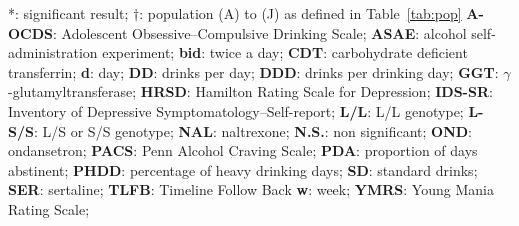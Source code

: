 *: significant result;
$\dagger$: population (A) to (J) as defined in Table~\ref{tab:pop}
\textbf{A-OCDS}: Adolescent Obsessive–Compulsive Drinking Scale;
\textbf{ASAE}: alcohol self-administration experiment;
\textbf{bid}: twice a day;
\textbf{CDT}: carbohydrate deficient transferrin;
\textbf{d}: day;
\textbf{DD}: drinks per day;
\textbf{DDD}: drinks per drinking day;
\textbf{GGT}: $\gamma$-glutamyltransferase;
\textbf{HRSD}: Hamilton Rating Scale for Depression;
\textbf{IDS-SR}: Inventory of Depressive Symptomatology–Self-report;
\textbf{L/L}: L/L genotype;
\textbf{L-S/S}: L/S or S/S genotype;
\textbf{NAL}: naltrexone;
\textbf{N.S.}: non significant;
\textbf{OND}: ondansetron;
\textbf{PACS}: Penn Alcohol Craving Scale;
\textbf{PDA}: proportion of days abstinent;
\textbf{PHDD}: percentage of heavy drinking days;
\textbf{SD}: standard drinks;
\textbf{SER}: sertaline;
\textbf{TLFB}: Timeline Follow Back
\textbf{w}: week;
\textbf{YMRS}: Young Mania Rating Scale;